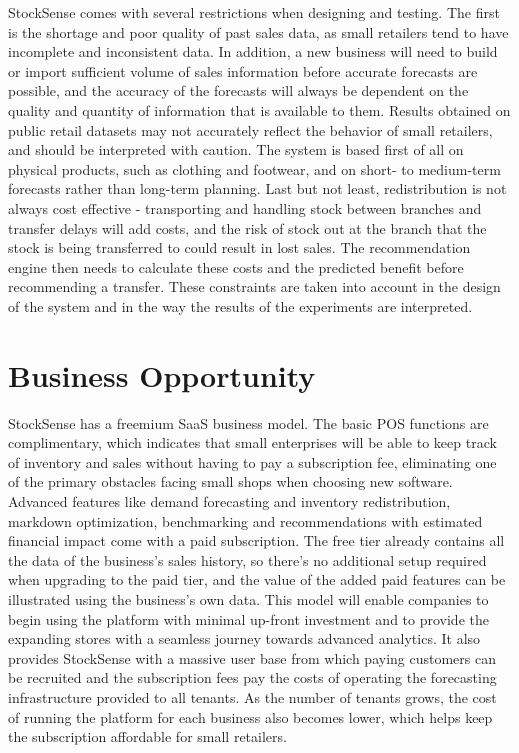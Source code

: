 \documentclass{StockSense}
\begin{document}
StockSense comes with several restrictions when designing and testing. The first is the shortage and poor quality of past sales data, as small retailers tend to have incomplete and inconsistent data. In addition, a new business will need to build or import sufficient volume of sales information before accurate forecasts are possible, and the accuracy of the forecasts will always be dependent on the quality and quantity of information that is available to them. Results obtained on public retail datasets may not accurately reflect the behavior of small retailers, and should be interpreted with caution. The system is based first of all on physical products, such as clothing and footwear, and on short- to medium-term forecasts rather than long-term planning. Last but not least, redistribution is not always cost effective - transporting and handling stock between branches and transfer delays will add costs, and the risk of stock out at the branch that the stock is being transferred to could result in lost sales. The recommendation engine then needs to calculate these costs and the predicted benefit before recommending a transfer. These constraints are taken into account in the design of the system and in the way the results of the experiments are interpreted.

\section{Business Opportunity}

StockSense has a freemium SaaS business model. The basic POS functions are complimentary, which indicates that small enterprises will be able to keep track of inventory and sales without having to pay a subscription fee, eliminating one of the primary obstacles facing small shops when choosing new software. Advanced features like demand forecasting and inventory redistribution, markdown optimization, benchmarking and recommendations with estimated financial impact come with a paid subscription. The free tier already contains all the data of the business's sales history, so there's no additional setup required when upgrading to the paid tier, and the value of the added paid features can be illustrated using the business's own data. This model will enable companies to begin using the platform with minimal up-front investment and to provide the expanding stores with a seamless journey towards advanced analytics. It also provides StockSense with a massive user base from which paying customers can be recruited and the subscription fees pay the costs of operating the forecasting infrastructure provided to all tenants. As the number of tenants grows, the cost of running the platform for each business also becomes lower, which helps keep the subscription affordable for small retailers.
\end{document}
